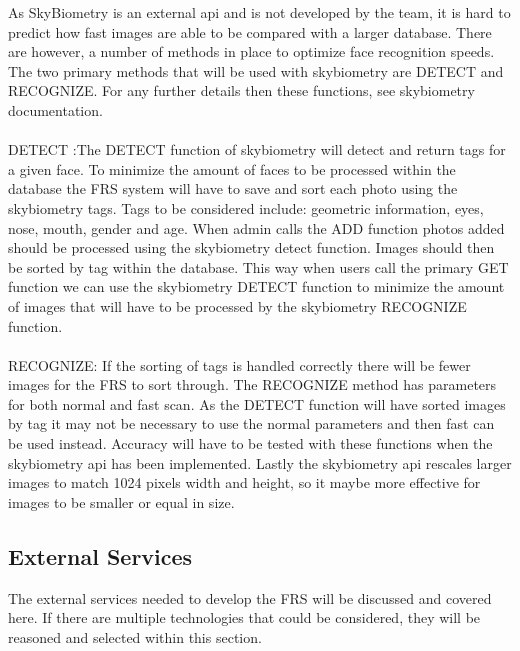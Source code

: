 \documentclass[a4paper,11pt]{article}
\begin{document}
As SkyBiometry is an external api and is not developed by the team, it is hard to predict how fast images are able to be compared with a larger database. There are however, a number of methods in place to optimize face recognition speeds. The two primary methods that will be used with skybiometry are DETECT and RECOGNIZE. For any further details then these functions, see skybiometry documentation.
\\\\
DETECT :The DETECT function of skybiometry will detect and return tags for a given face. To minimize the amount of faces to be processed within the database the FRS system will have to save and sort each photo using the skybiometry tags. Tags to be considered include: geometric information, eyes, nose, mouth, gender and age. When admin calls the ADD function photos added should be processed using the skybiometry detect function. Images should then be sorted by tag within the database. This way when users call the primary GET function we can use the skybiometry DETECT function to minimize the amount of images that will have to be processed by the skybiometry RECOGNIZE function.
\\\\
RECOGNIZE: If the sorting of tags is handled correctly there will be fewer images for the FRS to sort through. The RECOGNIZE method has parameters for both normal and fast scan. As the DETECT function will have sorted images by tag it may not be necessary to use the normal parameters and then fast can be used instead. Accuracy will have to be tested with these functions when the skybiometry api has been implemented. Lastly the skybiometry api rescales larger images to match 1024 pixels width and height, so it maybe more effective for images to be smaller or equal in size. 

\subsection{External Services}
The external services needed to develop the FRS will be discussed and covered here. If there are multiple technologies that could be considered, they will be reasoned and selected within this section. 
\end{document}
